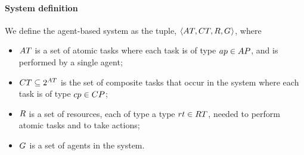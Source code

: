 \paragraph{System definition}
\label{section:system_definition}

We define the agent-based system as the tuple, $\langle 
	\setAtomicTask{}{},
	\setCompositeTask{}{},
	\setResource{}{},
	\setAgents{}{}
\rangle$, where
\begin{itemize}
	\item $\setAtomicTask{}{}$ is a set of atomic tasks where each task is of type $\varAtomicTaskType{}{} \in \setAtomicTaskType{}{}$, and is performed by a single agent;
	\item $\setCompositeTask{}{} \subseteq \powerSetSymbol{\setAtomicTask{}{}}{}{}$ is the set of composite tasks that occur in the system where each task is of type $\varCompositeTaskType{}{} \in \setCompositeTaskType{}{}$;
	\item $\setResource{}{}$ is a set of resources, each of type a type $\varResourceType{}{} \in \setResourceType{}{}$, needed to perform atomic tasks and to take actions;
	\item $G_{}^{}$ is a set of agents in the system.
\end{itemize}
